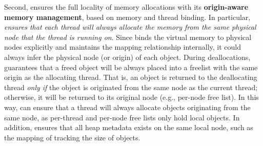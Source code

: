 Second, \NM{} ensures the full locality of memory allocations with its \textbf{origin-aware memory management}, based on memory and thread binding. In particular, \textit{\NM{} ensures that each thread will always allocate the memory from the same physical node that the thread is running on}. Since \NM{} binds the virtual memory to physical nodes explicitly and maintains the mapping relationship internally, it could always infer the physical node (or origin) of each object. During deallocations, \NM{} guarantees that a freed object will be always placed into a freelist with the same origin as the allocating thread. That is, an object is returned to the deallocating thread \textit{only if} the object is originated from the same node as the current thread; otherwise, it will be returned to its original node (e.g., per-node free list). 
In this way, \NM{} can ensure that a thread will always allocate objects originating from the same node, as per-thread and per-node free lists only hold local objects. In addition, \NM{} ensures that all heap metadata exists on the same local node, such as the mapping of tracking the size of objects.




 


